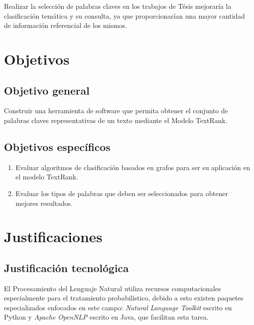 Realizar la selecci\'on de palabras claves en los trabajos de T\'esis mejorar\'ia la
clasificaci\'on tem\'atica y su consulta, ya que proporcionar\'ian una mayor cantidad
de informaci\'on referencial de los mismos.




\section{Objetivos}

\subsection{Objetivo general}
Construir una herramienta de software que permita obtener el conjunto de palabras claves
representativas de un texto mediante el Modelo TextRank.

\subsection{Objetivos espec\'ificos}
\begin{enumerate}
	\item Evaluar algoritmos de clasificaci\'on basados en grafos para ser su
	aplicaci\'on en el modelo TextRank.
	\item Evaluar los tipos de palabras que deben ser seleccionados para obtener mejores
	resultados.
\end{enumerate}

\section{Justificaciones}
\subsection{Justificaci\'on tecnol\'ogica}
El Procesamiento del Lenguaje Natural utiliza recursos computacionales especialmente
para el tratamiento probabil\'istico, debido a esto existen paquetes especializados
enfocados en este campo: \emph{Natural Language Toolkit} escrito en Python y
\emph{Apache OpenNLP} escrito en Java, que facilitan esta tarea.

